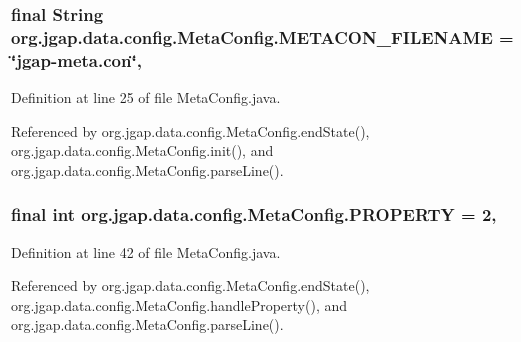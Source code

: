\hypertarget{classorg_1_1jgap_1_1data_1_1config_1_1_meta_config_aef46416edb3999cd12cf116ffad899f5}{
\subsubsection[{M\-E\-T\-A\-C\-O\-N\-\_\-\-F\-I\-L\-E\-N\-A\-M\-E}]{\setlength{\rightskip}{0pt plus 5cm}final String org.\-jgap.\-data.\-config.\-Meta\-Config.\-M\-E\-T\-A\-C\-O\-N\-\_\-\-F\-I\-L\-E\-N\-A\-M\-E = \char`\"{}jgap-\/meta.\-con\char`\"{}\hspace{0.3cm}{\ttfamily [static]}, {\ttfamily [private]}}}\label{classorg_1_1jgap_1_1data_1_1config_1_1_meta_config_aef46416edb3999cd12cf116ffad899f5}


Definition at line 25 of file Meta\-Config.\-java.



Referenced by org.\-jgap.\-data.\-config.\-Meta\-Config.\-end\-State(), org.\-jgap.\-data.\-config.\-Meta\-Config.\-init(), and org.\-jgap.\-data.\-config.\-Meta\-Config.\-parse\-Line().

\hypertarget{classorg_1_1jgap_1_1data_1_1config_1_1_meta_config_ad92a85d07a261b96d4e1ce3811a113e7}{
\subsubsection[{P\-R\-O\-P\-E\-R\-T\-Y}]{\setlength{\rightskip}{0pt plus 5cm}final int org.\-jgap.\-data.\-config.\-Meta\-Config.\-P\-R\-O\-P\-E\-R\-T\-Y = 2\hspace{0.3cm}{\ttfamily [static]}, {\ttfamily [private]}}}\label{classorg_1_1jgap_1_1data_1_1config_1_1_meta_config_ad92a85d07a261b96d4e1ce3811a113e7}


Definition at line 42 of file Meta\-Config.\-java.



Referenced by org.\-jgap.\-data.\-config.\-Meta\-Config.\-end\-State(), org.\-jgap.\-data.\-config.\-Meta\-Config.\-handle\-Property(), and org.\-jgap.\-data.\-config.\-Meta\-Config.\-parse\-Line().

